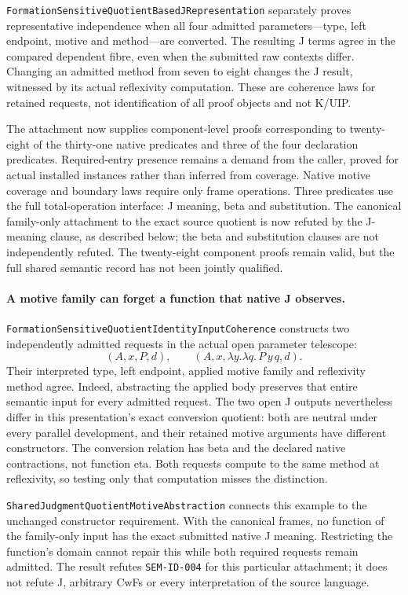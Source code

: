 \documentclass[11pt]{article}
\theoremstyle{definition}
\theoremstyle{remark}
\begin{document}
\nolinkurl{FormationSensitiveQuotientBasedJRepresentation} separately proves
representative independence when all four admitted parameters---type,
left endpoint, motive and method---are converted. The resulting J terms
agree in the compared dependent fibre, even when the submitted raw
contexts differ. Changing an admitted method from seven to eight changes
the J result, witnessed by its actual reflexivity computation. These are
coherence laws for retained requests, not identification of all proof
objects and not K/UIP.

The attachment now supplies component-level proofs corresponding to twenty-eight
of the thirty-one native predicates and three of the four declaration
predicates. Required-entry presence remains a demand from the caller, proved
for actual installed instances rather than inferred from coverage. Native
motive coverage and boundary laws require only frame operations. Three
predicates use the full total-operation interface: J meaning, beta and
substitution. The canonical family-only attachment to the exact source
quotient is now refuted by the J-meaning clause, as described below;
the beta and substitution clauses are not independently refuted. The
twenty-eight component proofs remain valid, but the full shared semantic
record has not been jointly qualified.

\paragraph{A motive family can forget a function that native J observes.}
\nolinkurl{FormationSensitiveQuotientIdentityInputCoherence} constructs
two independently admitted requests in the actual open parameter telescope:
\[
 (A,x,P,d),\qquad (A,x,\lambda y.\lambda q.\,P\,y\,q,d).
\]
Their interpreted type, left endpoint, applied motive family and
reflexivity method agree. Indeed, abstracting the applied body preserves
that entire semantic input for every admitted request. The two open J
outputs nevertheless differ in this presentation's exact conversion
quotient: both are neutral under every parallel development, and their
retained motive arguments have different constructors. The conversion
relation has beta and the declared native contractions, not function eta.
Both requests compute to the same method at reflexivity, so testing only
that computation misses the distinction.

\nolinkurl{SharedJudgmentQuotientMotiveAbstraction} connects this example
to the unchanged constructor requirement. With the canonical frames,
no function of the family-only input has the exact submitted native J
meaning. Restricting the function's domain cannot repair this while both
required requests remain admitted. The result refutes
\texttt{SEM-ID-004} for this particular attachment; it does not refute J,
arbitrary CwFs or every interpretation of the source language.
\end{document}
